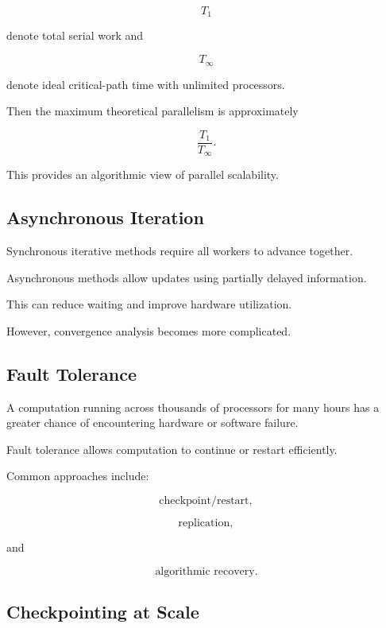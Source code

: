\[
T_1
\]

denote total serial work and

\[
T_\infty
\]

denote ideal critical-path time with unlimited processors.

Then the maximum theoretical parallelism is approximately

\[
\boxed{
\frac{
T_1
}{
T_\infty
}.
}
\]

This provides an algorithmic view of parallel scalability.

\subsection{Asynchronous Iteration}
\label{subsec:hpmc-asynchronous-iteration}

Synchronous iterative methods require all workers to advance together.

Asynchronous methods allow updates using partially delayed information.

This can reduce waiting and improve hardware utilization.

However, convergence analysis becomes more complicated.

\subsection{Fault Tolerance}
\label{subsec:hpmc-fault-tolerance}

A computation running across thousands of processors for many hours has a
greater chance of encountering hardware or software failure.

Fault tolerance allows computation to continue or restart efficiently.

Common approaches include:

\[
\boxed{
\text{checkpoint/restart},
}
\]

\[
\boxed{
\text{replication},
}
\]

and

\[
\boxed{
\text{algorithmic recovery}.
}
\]

\subsection{Checkpointing at Scale}
\label{subsec:hpmc-checkpointing}

